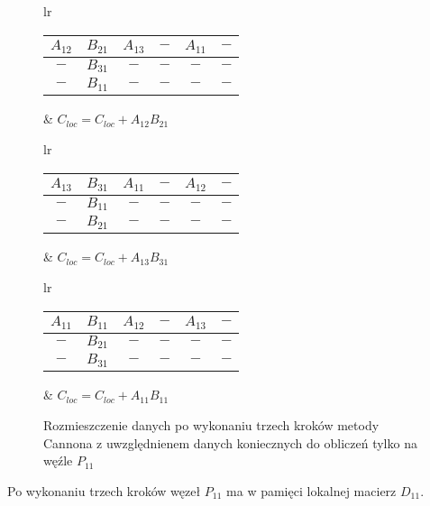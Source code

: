 \begin{figure}[h]
\centering
\begin{tabular}{lr}
\begin{tabular}{|cc|cc|cc|}
\hline
\(A_{12}\) & \(B_{21}\) & \(A_{13}\) & \(-\) & \(A_{11}\) & \(-\) \\
\hline
\(-\) & \(B_{31}\) & \(-\) & \(-\) & \(-\) & \(-\) \\
\hline
\(-\) & \(B_{11}\) & \(-\) & \(-\) & \(-\) & \(-\) \\
\hline
\end{tabular} &
\hspace{1cm}\(C_{loc}=C_{loc}+A_{12}B_{21}\)
\end{tabular}

\vspace{0.5cm}

\begin{tabular}{lr}
\begin{tabular}{|cc|cc|cc|}
\hline
\(A_{13}\) & \(B_{31}\) & \(A_{11}\) & \(-\) & \(A_{12}\) & \(-\) \\
\hline
\(-\) & \(B_{11}\) & \(-\) & \(-\) & \(-\) & \(-\) \\
\hline
\(-\) & \(B_{21}\) & \(-\) & \(-\) & \(-\) & \(-\) \\
\hline
\end{tabular} &
\hspace{1cm}\(C_{loc}=C_{loc}+A_{13}B_{31}\)
\end{tabular}

\vspace{0.5cm}

\begin{tabular}{lr}
\begin{tabular}{|cc|cc|cc|}
\hline
\(A_{11}\) & \(B_{11}\) & \(A_{12}\) & \(-\) & \(A_{13}\) & \(-\) \\
\hline
\(-\) & \(B_{21}\) & \(-\) & \(-\) & \(-\) & \(-\) \\
\hline
\(-\) & \(B_{31}\) & \(-\) & \(-\) & \(-\) & \(-\) \\
\hline
\end{tabular} &
\hspace{1cm}\(C_{loc}=C_{loc}+A_{11}B_{11}\)
\end{tabular}
\caption{Rozmieszczenie danych po wykonaniu trzech kroków metody Cannona z uwzględnienem danych koniecznych do obliczeń tylko na węźle \(P_{11}\)}
\label{fig:cannon_torus3}
\end{figure}

\noindent Po wykonaniu trzech kroków węzeł \(P_{11}\) ma w pamięci lokalnej macierz \(D_{11}\).

